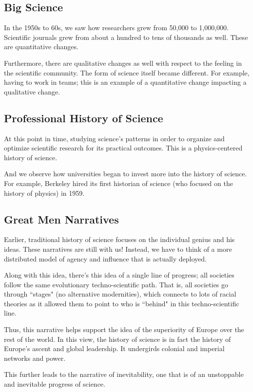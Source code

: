 \documentclass[openany]{book}
\begin{document}
\subsection{Big Science}
In the 1950s to 60s, we saw how researchers grew from 50,000 to 1,000,000. Scientific journals grew from about a hundred to tens of thousands as well. These are quantitative changes.

Furthermore, there are qualitative changes as well with respect to the feeling in the scientific community. The form of science itself became different. For example, having to work in teams; this is an example of a quantitative change impacting a qualitative change.

\subsection{Professional History of Science}
At this point in time, studying science's patterns in order to organize and optimize scientific research for its practical outcomes. This is a physics-centered history of science.

And we observe how universities began to invest more into the history of science. For example, Berkeley hired its first historian of science (who focused on the history of physics) in 1959.

\subsection{Great Men Narratives}
Earlier, traditional history of science focuses on the individual genius and his ideas. These narratives are still with us! Instead, we have to think of a more distributed model of agency and influence that is actually deployed.

Along with this idea, there's this idea of a single line of progress; all societies follow the same evolutionary techno-scientific path. That is, all societies go through ``stages" (no alternative modernities), which connects to lots of racial theories as it allowed them to point to who is ``behind" in this techno-scientific line.

Thus, this narrative helps support the idea of the superiority of Europe over the rest of the world. In this view, the history of science is in fact the history of Europe's ascent and global leadership. It undergirds colonial and imperial networks and power.

This further leads to the narrative of inevitability, one that is of an unstoppable and inevitable progress of science.
\end{document}
